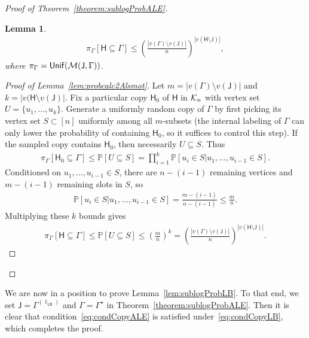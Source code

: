 \documentclass[12pt]{article}
\newtheorem{lemma}{Lemma}
\newcommand {\pr} {\mathbb{P}}
\newcommand{\calK}{{\cal K}}
\newcommand{\calM}{{\cal M}}
\newcommand{\p}[1]{\left(#1\right)}
\newcommand{\s}[1]{\mathsf{#1}}
\begin{document}
\begin{proof}[Proof of Theorem~\ref{theorem:sublogProbALE}]
\begin{lemma}
\begin{align}
    \pi_{\Gamma}[\s{H}\subseteq \Gamma]\leq \p{\frac{|v(\Gamma)\setminus v(\s{J})|}{n}}^{|v(\s{H}\setminus\s{J})|},
\end{align}
where $\pi_\Gamma=\s{Unif}(\calM(\s{J},\Gamma))$.
\end{lemma}
\begin{proof}[Proof of Lemma~\ref{lem:probcalc2Alsmot}]
Let $m = |v(\Gamma)\setminus v(\s{J})|$ and $k = |v(\s{H}\setminus v(\s{J})|$. Fix a particular copy $\s{H}_0$ of $\s{H}$ in $\calK_n$ with vertex set $U = \{u_1,\dots,u_k\}$. Generate a uniformly random copy of $\Gamma$ by first picking its vertex set $S \subset [n]$ uniformly among all $m$-subsets (the internal labeling of $\Gamma$ can only lower the probability of containing $\s{H}_0$, so it suffices to control this step). If the sampled copy contains $\s{H}_0$, then necessarily $U \subseteq S$. Thus
\begin{align}
\pi_{\Gamma}[\s{H}_0 \subseteq \Gamma] \leq \pr[U \subseteq S]
= \prod_{i=1}^{k} \pr[u_i \in S \vert u_1,\dots,u_{i-1} \in S].
\end{align}
Conditioned on $u_1,\dots,u_{i-1} \in S$, there are $n-(i-1)$ remaining vertices and $m-(i-1)$ remaining slots in $S$, so
\begin{align}
\pr[u_i \in S \vert u_1,\dots,u_{i-1} \in S] 
= \frac{m-(i-1)}{n-(i-1)} \leq \frac{m}{n}. 
\end{align}
Multiplying these $k$ bounds gives
\begin{align}
\pi_{\Gamma}[\s{H} \subseteq \Gamma] \leq\pr[U \subseteq S] \leq \left(\frac{m}{n}\right)^k = \p{\frac{|v(\Gamma)\setminus v(\s{J})|}{n}}^{|v(\s{H}\setminus\s{J})|}.
\end{align}
\end{proof}
\end{proof}
We are now in a position to prove Lemma~\ref{lem:sublogProbLB}. To that end, we set $\s{J} = \Gamma^{(\ell_{\s{LB}})}$ and $\Gamma = \Gamma^\star$ in Theorem~\ref{theorem:sublogProbALE}. Then it is clear that condition~\eqref{eq:condCopyALE} is satisfied under~\eqref{eq:condCopyLB}, which completes the proof.
\end{document}
